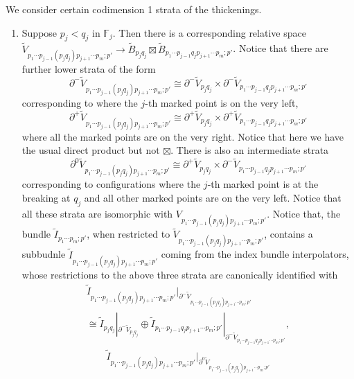 \documentclass[reqno, 10pt]{amsart}
\numberwithin{equation}{section}
\numberwithin{equation}{section}
\theoremstyle{definition}
\theoremstyle{remark}
\newcommand{\beqn}{\begin{equation*}}
\newcommand{\eeqn}{\end{equation*}}
\newcommand{\mb}{\mathbb}
\newcommand{\wt}{\widetilde}
\begin{document}
We consider certain codimension 1 strata of the thickenings. 
\begin{enumerate}
    \item Suppose $p_j < q_j$ in ${\mb F}_j$. Then there is a corresponding relative space $\wt V_{p_1 \cdots p_{j-1}(p_j q_j) p_{j+1} \cdots p_m; p'} \to \wt B_{p_j q_j}\boxtimes \wt B_{p_1 \cdots p_{j-1}q_j p_{j+1} \cdots p_m; p'}$. Notice that there are further lower strata of the form
    \beqn
    \partial^- \wt V_{p_1 \cdots p_{j-1} (p_j q_j) p_{j+1} \cdots p_m; p'} \cong \partial^- \wt V_{p_j q_j} \times \partial^- \wt V_{p_1 \cdots p_{j-1} q_j p_{j+1} \cdots p_m; p'}
    \eeqn
    corresponding to where the $j$-th marked point is on the very left,
    \beqn
    \partial^+ \wt V_{p_1 \cdots p_{j-1} (p_j q_j) p_{j+1} \cdots p_m; p'} \cong \partial^+ \wt V_{p_j q_j} \times \partial^+ \wt V_{p_1 \cdots p_{j-1} q_j p_{j+1} \cdots p_m; p'}
    \eeqn
    where all the marked points are on the very right. Notice that here we have the usual direct product but not $\boxtimes$. There is also an intermediate strata
    \beqn
    \partial^0 \wt V_{p_1 \cdots p_{j-1} (p_j q_j) p_{j+1} \cdots p_m; p'} \cong \partial^+ \wt V_{p_j q_j} \times \partial^- \wt V_{p_1 \cdots p_{j-1} q_j p_{j+1} \cdots p_m; p'}
    \eeqn
    corresponding to configurations where the $j$-th marked point is at the breaking at $q_j$ and all other marked points are on the very left. Notice that all these strata are isomorphic with $V_{p_1 \cdots p_{j-1}(p_j q_j) p_{j+1} \cdots p_m; p'}$. Notice that, the bundle $\wt I_{p_1 \cdots p_m; p'}$, when restricted to $\wt V_{p_1 \cdots p_{j-1} (p_j q_j) p_{j+1} \cdots p_m; p'}$, contains a subbudnle $\wt I_{p_1 \cdots p_{j-1}(p_j q_j) p_{j+1} \cdots p_m; p'}$ coming from the index bundle interpolators, whose restrictions to the above three strata are canonically identified with 
    \begin{multline*}
    \wt I_{p_1 \cdots p_{j-1} (p_j q_j) p_{j+1} \cdots p_m; p'}|_{\partial^- \wt V_{p_1 \cdots p_{j-1} (p_j q_j) p_{j+1} \cdots p_m; p'}} \\
    \cong \wt I_{p_j q_j}|_{\partial^- \wt V_{p_j q_j}} \oplus \wt I_{p_1 \cdots p_{j-1} q_j p_{j+1} \cdots p_m; p'}|_{\partial^- \wt V_{p_1 \cdots p_{j-1} q_j p_{j+1} \cdots p_m; p'}},
    \end{multline*}
\begin{multline*}
    \wt I_{p_1 \cdots p_{j-1} (p_j q_j) p_{j+1} \cdots p_m; p'}|_{\partial^0 \wt V_{p_1 \cdots p_{j-1} (p_j q_j) p_{j+1} \cdots p_m; p'}} \\

\end{multline*}
\end{enumerate}
\end{document}
